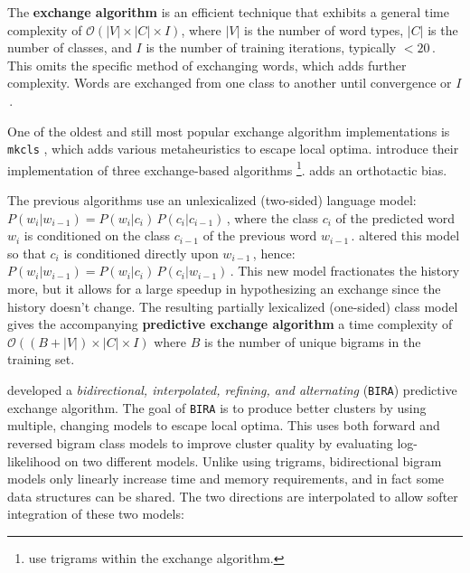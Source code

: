The \textbf{exchange algorithm} \citep{kneser-ney1993} is an efficient technique that exhibits a general time complexity of 
$\mathcal{O}(|V| \times |C| \times I)$, where %
$|V|$ is the number of word types, %
$|C|$ is the number of classes, and $I$ is the number of training iterations, typically $<20$\,.
This omits the specific method of exchanging words, which adds further complexity.
Words are exchanged from one class to another until convergence or $I$\,.

One of the oldest and still most popular exchange algorithm implementations is {\tt mkcls} \citep{och1995}, which adds various metaheuristics to escape local optima. \cite{botros-etal2015}  introduce their implementation of three exchange-based algorithms \citep{martin-etal1998,mueller-schuetze2015}\footnote{use trigrams within the exchange algorithm.}. \cite{clark2003} adds an orthotactic bias.

The previous algorithms use an unlexicalized (two-sided) language model: %
$
	P(w_i|w_{i-1}) = P(w_i|c_i) \, P(c_i|c_{i-1})
$\,,
where the class $c_i$ of the predicted word $w_i$ is conditioned on the class $c_{i-1}$ of the previous word $w_{i-1}$\,.
\cite{goodman2001} altered this model so that $c_i$ is conditioned directly upon $w_{i-1}$\,, hence:
$
	P(w_i|w_{i-1}) = P(w_i|c_i) \, P(c_i|w_{i-1})
$\,.
This new model fractionates the history more, but it allows for a large speedup in hypothesizing an exchange since the history doesn't change.
The resulting partially lexicalized (one-sided) class model gives the accompanying \textbf{predictive exchange algorithm} \citep{goodman2001,uszkoreit-brants2008} a time complexity of
$\mathcal{O}((B + |V|) \times |C| \times I)$
where $B$ is the number of unique bigrams in the training set.

\cite{dehdari-tan-vangenabith:2016:N16-1} developed a \emph{bidirectional, interpolated, refining, and alternating} ({\tt BIRA}) predictive exchange algorithm. The goal of {\tt BIRA} is to produce better clusters by using multiple, changing models to escape local optima. This uses both forward and reversed bigram class models to improve cluster quality by evaluating log-likeli\-hood on two different models. Unlike using trigrams, bidirectional bigram models only linearly increase time and memory requirements, and in fact some data structures can be shared.
The two directions are interpolated to allow softer integration of these two models:


